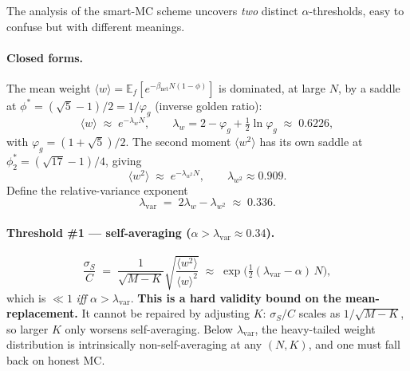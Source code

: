 \documentclass[11pt]{article}
\begin{document}
The analysis of the smart-MC scheme uncovers \emph{two} distinct $\alpha$-thresholds, easy to confuse but with different meanings.

\paragraph{Closed forms.}
The mean weight $\langle w\rangle = \mathbb{E}_f[e^{-\beta_{\mathrm{net}}N(1-\phi)}]$ is dominated, at large $N$, by a saddle at $\phi^* = (\sqrt5-1)/2 = 1/\varphi_g$ (inverse golden ratio):
\begin{equation}
\langle w\rangle \;\approx\; e^{-\lambda_w N},\qquad
\lambda_w = 2 - \varphi_g + \tfrac{1}{2}\ln\varphi_g \;\approx\; 0.6226,
\end{equation}
with $\varphi_g = (1+\sqrt5)/2$. The second moment $\langle w^2\rangle$ has its own saddle at $\phi^*_2 = (\sqrt{17}-1)/4$, giving
\begin{equation}
\langle w^2\rangle \;\approx\; e^{-\lambda_{w^2} N},\qquad \lambda_{w^2} \approx 0.909.
\end{equation}
Define the relative-variance exponent
\begin{equation}
\lambda_{\mathrm{var}} \;=\; 2\lambda_w - \lambda_{w^2} \;\approx\; 0.336.
\end{equation}

\paragraph{Threshold \#1 — self-averaging ($\alpha > \lambda_{\mathrm{var}} \approx 0.34$).}
\begin{equation}
\frac{\sigma_S}{C} \;=\; \frac{1}{\sqrt{M-K}}\sqrt{\frac{\langle w^2\rangle}{\langle w\rangle^2}} \;\approx\; \exp\!\Big(\tfrac{1}{2}(\lambda_{\mathrm{var}} - \alpha)\,N\Big),
\end{equation}
which is $\ll 1$ \emph{iff} $\alpha > \lambda_{\mathrm{var}}$. \textbf{This is a hard validity bound on the mean-replacement.} It cannot be repaired by adjusting $K$: $\sigma_S/C$ scales as $1/\sqrt{M-K}$, so larger $K$ only worsens self-averaging. Below $\lambda_{\mathrm{var}}$, the heavy-tailed weight distribution is intrinsically non-self-averaging at any $(N,K)$, and one must fall back on honest MC.
\end{document}
